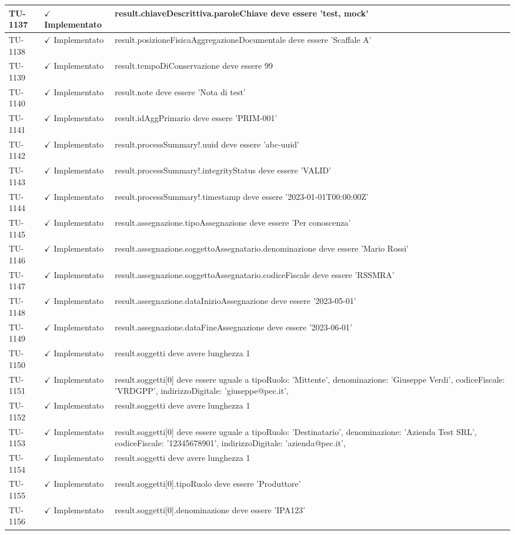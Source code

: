 ﻿\documentclass[a4paper,12pt]{article}
\newcommand{\ok}{\textcolor{green!60!black}{$\checkmark$ Implementato}}
\begin{document}
\begin{longtable}{|p{2cm}|p{3.5cm}|p{9.5cm}|}
\hline
TU-1137 & \ok & result.chiaveDescrittiva.paroleChiave deve essere 'test, mock' \\
\hline
TU-1138 & \ok & result.posizioneFisicaAggregazioneDocumentale deve essere 'Scaffale A' \\
\hline
TU-1139 & \ok & result.tempoDiConservazione deve essere 99 \\
\hline
TU-1140 & \ok & result.note deve essere 'Nota di test' \\
\hline
TU-1141 & \ok & result.idAggPrimario deve essere 'PRIM-001' \\
\hline
TU-1142 & \ok & result.processSummary!.uuid deve essere 'abc-uuid' \\
\hline
TU-1143 & \ok & result.processSummary!.integrityStatus deve essere 'VALID' \\
\hline
TU-1144 & \ok & result.processSummary!.timestamp deve essere '2023-01-01T00:00:00Z' \\
\hline
TU-1145 & \ok & result.assegnazione.tipoAssegnazione deve essere 'Per conoscenza' \\
\hline
TU-1146 & \ok & result.assegnazione.soggettoAssegnatario.denominazione deve essere 'Mario Rossi' \\
\hline
TU-1147 & \ok & result.assegnazione.soggettoAssegnatario.codiceFiscale deve essere 'RSSMRA' \\
\hline
TU-1148 & \ok & result.assegnazione.dataInizioAssegnazione deve essere '2023-05-01' \\
\hline
TU-1149 & \ok & result.assegnazione.dataFineAssegnazione deve essere '2023-06-01' \\
\hline
TU-1150 & \ok & result.soggetti deve avere lunghezza 1 \\
\hline
TU-1151 & \ok & result.soggetti[0] deve essere uguale a { tipoRuolo: 'Mittente', denominazione: 'Giuseppe Verdi', codiceFiscale: 'VRDGPP', indirizzoDigitale: 'giuseppe@pec.it', } \\
\hline
TU-1152 & \ok & result.soggetti deve avere lunghezza 1 \\
\hline
TU-1153 & \ok & result.soggetti[0] deve essere uguale a { tipoRuolo: 'Destinatario', denominazione: 'Azienda Test SRL', codiceFiscale: '12345678901', indirizzoDigitale: 'azienda@pec.it', } \\
\hline
TU-1154 & \ok & result.soggetti deve avere lunghezza 1 \\
\hline
TU-1155 & \ok & result.soggetti[0].tipoRuolo deve essere 'Produttore' \\
\hline
TU-1156 & \ok & result.soggetti[0].denominazione deve essere 'IPA123' \\

\end{longtable}
\end{document}
